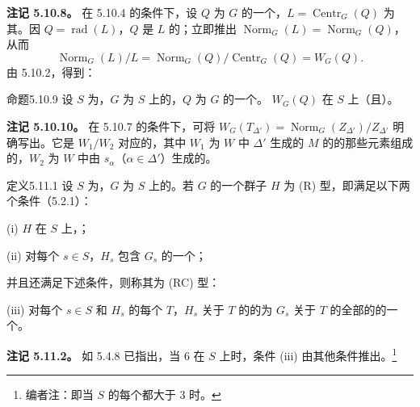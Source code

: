 \textbf{注记 5.10.8。} 在 5.10.4 的条件下，设 $Q$ 为 $G$ 的一个，$L=\operatorname{Centr}_G(Q)$ 为其。因 $Q=\operatorname{rad}(L)$，$Q$ 是 $L$ 的；立即推出 $\operatorname{Norm}_G(L)=\operatorname{Norm}_G(Q)$，从而
\[\operatorname{Norm}_G(L)/L=\operatorname{Norm}_G(Q)/\operatorname{Centr}_G(Q)=W_G(Q).\]
由 5.10.2，得到：
\begin{SGAresult}{命题}{5.10.9}
设 $S$ 为，$G$ 为 $S$ 上的，$Q$ 为 $G$ 的一个。 $W_G(Q)$ 在 $S$ 上（且）。
\end{SGAresult}
\textbf{注记 5.10.10。} 在 5.10.7 的条件下，可将 $W_G(T_{\Delta'})=\operatorname{Norm}_G(Z_{\Delta'})/Z_{\Delta'}$ 明确写出。它是 $W_1/W_2$ 对应的，其中 $W_1$ 为 $W$ 中 $\Delta'$ 生成的 $M$ 的的那些元素组成的，$W_2$ 为 $W$ 中由 $s_\alpha$（$\alpha\in\Delta'$）生成的。
\begin{SGAresult}{定义}{5.11.1}
设 $S$ 为，$G$ 为 $S$ 上的。若 $G$ 的一个群子 $H$ 为 (R) 型，即满足以下两个条件（5.2.1）：

(i) $H$ 在 $S$ 上，；

(ii) 对每个 $s\in S$，$H_s$ 包含 $G_s$ 的一个；

并且还满足下述条件，则称其为 (RC) 型：

(iii) 对每个 $s\in S$ 和 $H_s$ 的每个 $T$，$H_s$ 关于 $T$ 的的为 $G_s$ 关于 $T$ 的全部的的一个。
\end{SGAresult}
\textbf{注记 5.11.2。} 如 5.4.8 已指出，当 $6$ 在 $S$ 上时，条件 (iii) 由其他条件推出。\footnote{编者注：即当 $S$ 的每个都大于 $3$ 时。}
